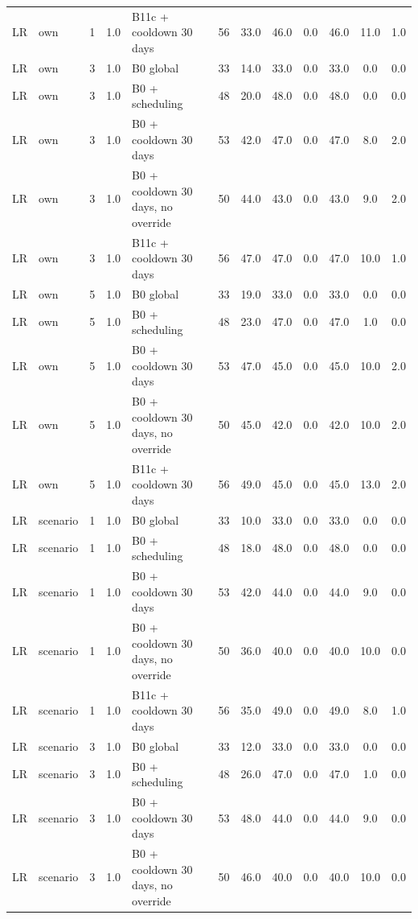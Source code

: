 \begin{longtable}{lllllccccccc}
LR & own & 1 & 1.0 & B11c + cooldown 30 days & 56 & 33.0 & 46.0 & 0.0 & 46.0 & 11.0 & 1.0 \\
LR & own & 3 & 1.0 & B0 global & 33 & 14.0 & 33.0 & 0.0 & 33.0 & 0.0 & 0.0 \\
LR & own & 3 & 1.0 & B0 + scheduling & 48 & 20.0 & 48.0 & 0.0 & 48.0 & 0.0 & 0.0 \\
LR & own & 3 & 1.0 & B0 + cooldown 30 days & 53 & 42.0 & 47.0 & 0.0 & 47.0 & 8.0 & 2.0 \\
LR & own & 3 & 1.0 & B0 + cooldown 30 days, no override & 50 & 44.0 & 43.0 & 0.0 & 43.0 & 9.0 & 2.0 \\
LR & own & 3 & 1.0 & B11c + cooldown 30 days & 56 & 47.0 & 47.0 & 0.0 & 47.0 & 10.0 & 1.0 \\
LR & own & 5 & 1.0 & B0 global & 33 & 19.0 & 33.0 & 0.0 & 33.0 & 0.0 & 0.0 \\
LR & own & 5 & 1.0 & B0 + scheduling & 48 & 23.0 & 47.0 & 0.0 & 47.0 & 1.0 & 0.0 \\
LR & own & 5 & 1.0 & B0 + cooldown 30 days & 53 & 47.0 & 45.0 & 0.0 & 45.0 & 10.0 & 2.0 \\
LR & own & 5 & 1.0 & B0 + cooldown 30 days, no override & 50 & 45.0 & 42.0 & 0.0 & 42.0 & 10.0 & 2.0 \\
LR & own & 5 & 1.0 & B11c + cooldown 30 days & 56 & 49.0 & 45.0 & 0.0 & 45.0 & 13.0 & 2.0 \\
LR & scenario & 1 & 1.0 & B0 global & 33 & 10.0 & 33.0 & 0.0 & 33.0 & 0.0 & 0.0 \\
LR & scenario & 1 & 1.0 & B0 + scheduling & 48 & 18.0 & 48.0 & 0.0 & 48.0 & 0.0 & 0.0 \\
LR & scenario & 1 & 1.0 & B0 + cooldown 30 days & 53 & 42.0 & 44.0 & 0.0 & 44.0 & 9.0 & 0.0 \\
LR & scenario & 1 & 1.0 & B0 + cooldown 30 days, no override & 50 & 36.0 & 40.0 & 0.0 & 40.0 & 10.0 & 0.0 \\
LR & scenario & 1 & 1.0 & B11c + cooldown 30 days & 56 & 35.0 & 49.0 & 0.0 & 49.0 & 8.0 & 1.0 \\
LR & scenario & 3 & 1.0 & B0 global & 33 & 12.0 & 33.0 & 0.0 & 33.0 & 0.0 & 0.0 \\
LR & scenario & 3 & 1.0 & B0 + scheduling & 48 & 26.0 & 47.0 & 0.0 & 47.0 & 1.0 & 0.0 \\
LR & scenario & 3 & 1.0 & B0 + cooldown 30 days & 53 & 48.0 & 44.0 & 0.0 & 44.0 & 9.0 & 0.0 \\
LR & scenario & 3 & 1.0 & B0 + cooldown 30 days, no override & 50 & 46.0 & 40.0 & 0.0 & 40.0 & 10.0 & 0.0 \\

\end{longtable}
